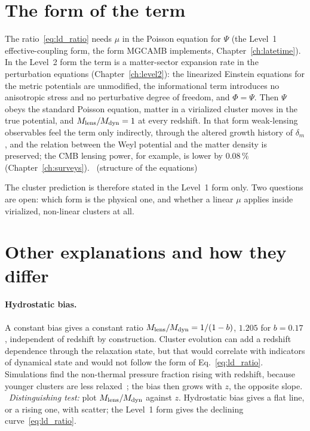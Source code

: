 \section{The form of the term}\label{sec:ld_hold}
The ratio~\eqref{eq:ld_ratio} needs $\mu$ in the Poisson equation for $\Psi$ (the Level~1 effective-coupling form, the form MGCAMB implements,
Chapter~\ref{ch:latetime}). In the Level~2 form the term is a matter-sector expansion rate in the perturbation equations (Chapter~\ref{ch:level2}):
the linearized Einstein equations for the metric potentials are unmodified, the informational term introduces no anisotropic stress and no
perturbative degree of freedom, and $\Phi=\Psi$. Then $\Psi$ obeys the standard Poisson equation, matter in a virialized cluster moves in the true
potential, and $M_{\rm lens}/M_{\rm dyn}=1$ at every redshift. In that form weak-lensing observables feel the term only indirectly, through the altered
growth history of $\delta_m$, and the relation between the Weyl potential and the matter density is preserved; the CMB lensing power, for example, is
lower by $0.08\,\%$ (Chapter~\ref{ch:surveys}). \derived\ (structure of the equations)

The cluster prediction is therefore stated in the Level~1 form only. Two questions are open: which form is the physical one, and whether a linear
$\mu$ applies inside virialized, non-linear clusters at all. \openprob

\section{Other explanations and how they differ}\label{sec:ld_alternatives}
\paragraph{Hydrostatic bias.} A constant bias gives a constant ratio $M_{\rm lens}/M_{\rm dyn}=1/(1-b)$, $1.205$ for $b=0.17$ \calc, independent of
redshift by construction. Cluster evolution can add a redshift dependence through the relaxation state, but that would correlate with indicators of
dynamical state and would not follow the form of Eq.~\eqref{eq:ld_ratio}. Simulations find the non-thermal pressure fraction rising with redshift,
because younger clusters are less relaxed~\cite{Nelson2014,ShiKomatsu2014}; the bias then grows with $z$, the opposite slope. \observed\
\emph{Distinguishing test:} plot $M_{\rm lens}/M_{\rm dyn}$ against $z$. Hydrostatic bias gives a flat line, or a rising one, with scatter;
the Level~1 form gives the declining curve~\eqref{eq:ld_ratio}. \prediction

